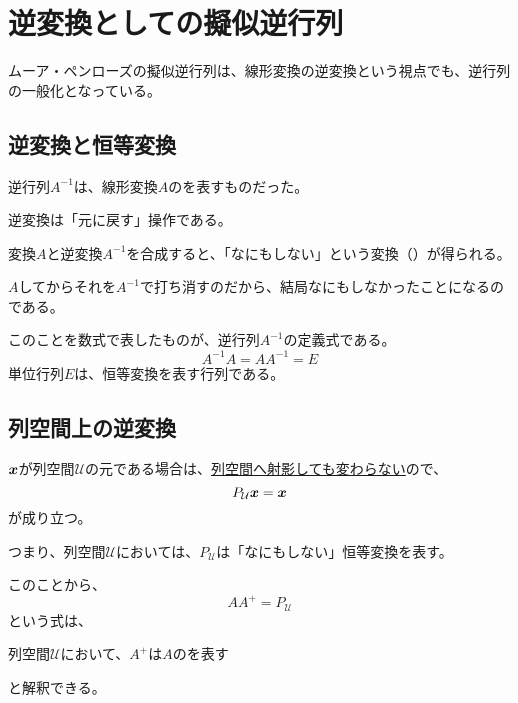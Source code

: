 \documentclass[../../../topic_linear-algebra]{subfiles}
\begin{document}
\sectionline
\section{逆変換としての擬似逆行列}

ムーア・ペンローズの擬似逆行列は、線形変換の逆変換という視点でも、逆行列の一般化となっている。

\subsection{逆変換と恒等変換}

逆行列$A^{-1}$は、線形変換$A$のを表すものだった。

逆変換は「元に戻す」操作である。

\br

変換$A$と逆変換$A^{-1}$を合成すると、「なにもしない」という変換（）が得られる。

$A$してからそれを$A^{-1}$で打ち消すのだから、結局なにもしなかったことになるのである。

\br

このことを数式で表したものが、逆行列$A^{-1}$の定義式である。
\begin{equation*}
  A^{-1} A = A A^{-1} = E
\end{equation*}
単位行列$E$は、恒等変換を表す行列である。

\subsection{列空間上の逆変換}

$\vb*{x}$が列空間$\mathcal{U}$の元である場合は、\hyperref[sec:projection-onto-subspace]{列空間へ射影しても変わらない}ので、
\begin{equation*}
  P_{\mathcal{U}} \vb*{x} = \vb*{x}
\end{equation*}
が成り立つ。

つまり、列空間$\mathcal{U}$においては、$P_{\mathcal{U}}$は「なにもしない」恒等変換を表す。

\br

このことから、
\begin{equation*}
  AA^+ = P_{\mathcal{U}}
\end{equation*}
という式は、
\begin{emphabox}
  \begin{spacebox}
    \begin{center}
      列空間$\mathcal{U}$において、$A^+$は$A$のを表す
    \end{center}
  \end{spacebox}
\end{emphabox}
と解釈できる。
\end{document}
